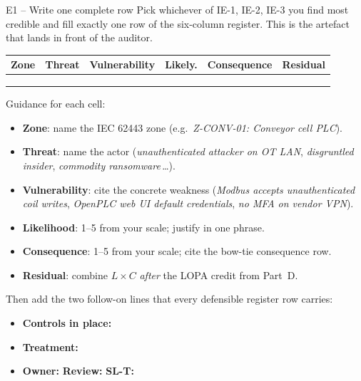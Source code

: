 \documentclass[11pt,a4paper]{article}
\begin{document}
\begin{stepbox}{E1 -- Write one complete row}
Pick whichever of IE-1, IE-2, IE-3 you find most credible and fill exactly one row of the six-column register. This is the artefact that lands in front of the auditor.

\medskip
\renewcommand{\arraystretch}{1.4}
\footnotesize
\begin{tabular}{|p{14mm}|p{22mm}|p{28mm}|p{18mm}|p{22mm}|p{18mm}|}
\hline
\textbf{Zone} & \textbf{Threat} & \textbf{Vulnerability} & \textbf{Likely.} & \textbf{Consequence} & \textbf{Residual} \\
\hline
& & & & & \\
& & & & & \\
& & & & & \\
\hline
\end{tabular}

\medskip\noindent
Guidance for each cell:
\begin{itemize}\setlength{\itemsep}{1pt}
  \item \textbf{Zone}: name the IEC 62443 zone (e.g.\ \emph{Z-CONV-01: Conveyor cell PLC}).
  \item \textbf{Threat}: name the actor (\emph{unauthenticated attacker on OT LAN}, \emph{disgruntled insider}, \emph{commodity ransomware}\,\ldots).
  \item \textbf{Vulnerability}: cite the concrete weakness (\emph{Modbus accepts unauthenticated coil writes}, \emph{OpenPLC web UI default credentials}, \emph{no MFA on vendor VPN}).
  \item \textbf{Likelihood}: 1--5 from your scale; justify in one phrase.
  \item \textbf{Consequence}: 1--5 from your scale; cite the bow-tie consequence row.
  \item \textbf{Residual}: combine $L \times C$ \emph{after} the LOPA credit from Part~D.
\end{itemize}

\medskip
Then add the two follow-on lines that every defensible register row carries:
\begin{itemize}\setlength{\itemsep}{1pt}
  \item \textbf{Controls in place:} \underline{\hspace{120mm}}
  \item \textbf{Treatment:} \underline{\hspace{125mm}}
  \item \textbf{Owner:} \underline{\hspace{30mm}} \quad \textbf{Review:} \underline{\hspace{20mm}} \quad \textbf{SL-T:} \underline{\hspace{10mm}}
\end{itemize}
\end{stepbox}
\end{document}
